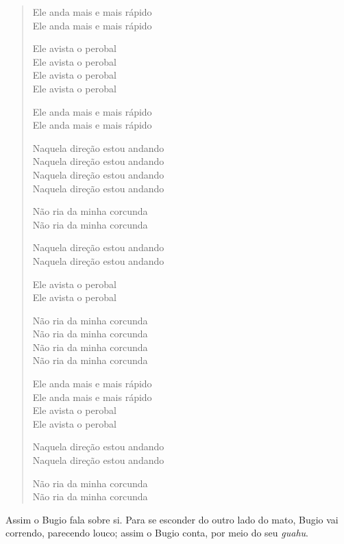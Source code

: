 \begin{verse}
Ele anda mais e mais rápido\\
Ele anda mais e mais rápido

Ele avista o perobal\footnotemark{}\\
Ele avista o perobal\\
Ele avista o perobal\\
Ele avista o perobal

Ele anda mais e mais rápido\\
Ele anda mais e mais rápido

Naquela direção estou andando\\
Naquela direção estou andando\\
Naquela direção estou andando\\
Naquela direção estou andando

Não ria da minha corcunda\\
Não ria da minha corcunda

Naquela direção estou andando\\
Naquela direção estou andando

Ele avista o perobal\\
Ele avista o perobal

Não ria da minha corcunda\\
Não ria da minha corcunda\\
Não ria da minha corcunda\\
Não ria da minha corcunda	

Ele anda mais e mais rápido\\
Ele anda mais e mais rápido\\
Ele avista o perobal\\
Ele avista o perobal

Naquela direção estou andando\\
Naquela direção estou andando

Não ria da minha corcunda\\
Não ria da minha corcunda
\end{verse}


Assim o Bugio fala sobre si. Para se esconder do outro lado do mato,
Bugio vai correndo, parecendo louco; assim o Bugio conta, por meio do
seu \emph{guahu}.

